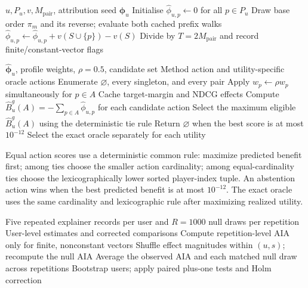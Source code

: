 \documentclass[pdflatex,sn-mathphys-num]{sn-jnl}
\begin{document}
\begin{algorithm}[t]
\caption{Paired Monte Carlo attribution}
\label{alg:shapley}
\begin{algorithmic}[1]
\Require $u,P_u,v,M_{\mathrm{pair}}$, attribution seed
\Ensure $\widehat{\boldsymbol\phi}_u$
\State Initialise $\hat\phi_{u,p}\gets0$ for all $p\in P_u$
\State Draw base order $\pi_m$ and its reverse; evaluate both cached prefix walks
\State $\hat\phi_{u,p}\gets\hat\phi_{u,p}+v(S\cup\{p\})-v(S)$
\EndFor
\EndFor
\State Divide by $T=2M_{\mathrm{pair}}$ and record finite/constant-vector flags
\end{algorithmic}
\end{algorithm}

\begin{algorithm}[t]
\caption{Signed action selection and exact budget-two oracle}
\label{alg:actions}
\begin{algorithmic}[1]
\Require $\hat{\boldsymbol\phi}_u$, profile weights, $\rho=0.5$, candidate set
\Ensure Method action and utility-specific oracle actions
\State Enumerate $\varnothing$, every singleton, and every pair
\State Apply $w_p\gets\rho w_p$ simultaneously for $p\in A$
\State Cache target-margin and NDCG effects
\EndFor
\State Compute $\widehat B_u^g(A)=-\sum_{p\in A}\hat\phi_{u,p}$ for each candidate action
\State Select the maximum eligible $\widehat B_u^g(A)$ using the deterministic tie rule
\State Return $\varnothing$ when the best score is at most $10^{-12}$
\State Select the exact oracle separately for each utility
\end{algorithmic}
\end{algorithm}

Equal action scores use a deterministic common rule: maximize predicted benefit first; among ties choose the smaller action cardinality; among equal-cardinality ties choose the lexicographically lower sorted player-index tuple. An abstention action wins when the best predicted benefit is at most $10^{-12}$. The exact oracle uses the same cardinality and lexicographic rule after maximizing realized utility.

\begin{algorithm}[t]
\caption{Distinct-user inference and AIA null}
\label{alg:inference}
\begin{algorithmic}[1]
\Require Five repeated explainer records per user and $R=1000$ null draws per repetition
\Ensure User-level estimates and corrected comparisons
\State Compute repetition-level AIA only for finite, nonconstant vectors
\State Shuffle effect magnitudes within $(u,s)$; recompute the null AIA
\EndFor
\EndFor
{}
\State Average the observed AIA and each matched null draw across repetitions
\EndFor
\State Bootstrap users; apply paired plus-one tests and Holm correction
\end{algorithmic}
\end{algorithm}
\end{document}
